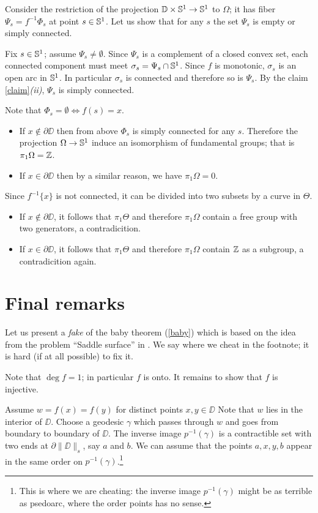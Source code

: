 \documentclass{article}
\begin{document}
Consider the restriction of the projection $\mathbb{D}\times\mathbb{S}^1\to \mathbb{S}^1$ to $\Omega$;
it has fiber $\Psi_s=f^{-1}\Phi_s$ at point $s\in\mathbb{S}^1$.
Let us show that for any $s$ the set $\Psi_s$ is empty or simply connected.

Fix $s\in\mathbb{S}^1$; assume $\Psi_s\ne \emptyset$.
Since $\Psi_s$ is a complement of a closed convex set,
each connected component must meet $\sigma_s=\Psi_s\cap\mathbb{S}^1$.
Since $f$ is monotonic, $\sigma_s$ is an open arc in $\mathbb{S}^1$.
In particular $\sigma_s$ is connected and therefore so is $\Psi_s$.
By the claim \ref{claim}\textit{(ii)}, $\Psi_s$ is simply connected.

Note that $\Phi_s=\emptyset\iff f(s)=x$.
\begin{itemize}
\item If $x\notin\partial\DD$ then from above $\Phi_s$ is simply connected for any $s$.
Therefore the projection $\Omega\to \mathbb{S}^1$ induce an isomorphism of fundamental groups; that is $\pi_1\Omega=\mathbb{Z}$.
\item If $x\in\partial\DD$ then by a similar reason, we have $\pi_1\Omega=0$.
\end{itemize}



Since $f^{-1}\{x\}$ is not connected, it can be divided into two subsets by a curve in $\Theta$.
\begin{itemize}
\item If $x\notin\partial \DD$, it follows that $\pi_1\Theta$ and therefore $\pi_1\Omega$ contain a free group with two generators, a contradicition.
\item If $x\in\partial\DD$, it follows that $\pi_1\Theta$ and therefore $\pi_1\Omega$ contain $\mathbb{Z}$ as a subgroup, a contradicition again.\qeds
\end{itemize}


\section{Final remarks}

Let us present a \emph{fake} of the baby theorem (\ref{baby}) which is based on the idea from the problem ``Saddle surface'' in \cite{petrunin-orthodox}.
We say where we cheat in the footnote; 
it is hard (if at all possible) to fix it.

Note that  $\deg f=1$;
in particular $f$ is onto.
It remains to show that $f$ is injective.

Assume  $w=f(x)=f(y)$ for distinct points $x,y\in\DD$
Note that  $w$ lies in the interior of $\DD$.
Choose a geodesic $\gamma$ which passes through $w$ and goes 
from boundary to boundary of $\DD$.
The inverse image $p^{-1}(\gamma)$ is a contractible set with two ends at $\partial\|\DD\|_s$, say $a$ and $b$.
We can assume that the points $a,x,y,b$ appear in the same order on $p^{-1}(\gamma)$.\footnote{This is where we are cheating: the inverse image $p^{-1}(\gamma)$ might be as terrible as psedoarc, where the order points has no sense.}
\end{document}
